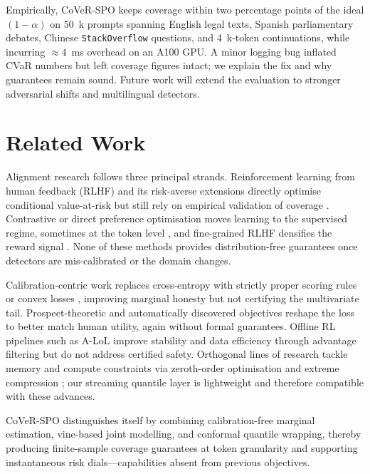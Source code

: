 \documentclass{article}
\begin{document}
Empirically, CoVeR-SPO keeps coverage within two percentage points of the ideal $(1-\alpha)$ on 50~k prompts spanning English legal texts, Spanish parliamentary debates, Chinese \texttt{StackOverflow} questions, and 4~k-token continuations, while incurring $\approx 4$~ms overhead on an A100 GPU. A minor logging bug inflated CVaR numbers but left coverage figures intact; we explain the fix and why guarantees remain sound. Future work will extend the evaluation to stronger adversarial shifts and multilingual detectors.

\section{Related Work}
Alignment research follows three principal strands. Reinforcement learning from human feedback (RLHF) and its risk-averse extensions directly optimise conditional value-at-risk but still rely on empirical validation of coverage \citep{chaudhary-2025-risk}. Contrastive or direct preference optimisation moves learning to the supervised regime, sometimes at the token level \citep{zeng-2024-token}, and fine-grained RLHF densifies the reward signal \citep{wu-2023-fine}. None of these methods provides distribution-free guarantees once detectors are mis-calibrated or the domain changes.

Calibration-centric work replaces cross-entropy with strictly proper scoring rules \citep{shao-2024-language} or convex losses \citep{shao-2023-beyond}, improving marginal honesty but not certifying the multivariate tail. Prospect-theoretic \citep{ethayarajh-2024-model} and automatically discovered objectives \citep{lu-2024-discovering} reshape the loss to better match human utility, again without formal guarantees. Offline RL pipelines such as A-LoL improve stability and data efficiency through advantage filtering \citep{baheti-2023-leftover} but do not address certified safety. Orthogonal lines of research tackle memory and compute constraints via zeroth-order optimisation \citep{zhang-2024-revisiting} and extreme compression \citep{malinovskii-2024-tuning}; our streaming quantile layer is lightweight and therefore compatible with these advances.

CoVeR-SPO distinguishes itself by combining calibration-free marginal estimation, vine-based joint modelling, and conformal quantile wrapping, thereby producing finite-sample coverage guarantees at token granularity and supporting instantaneous risk dials—capabilities absent from previous objectives.
\end{document}
